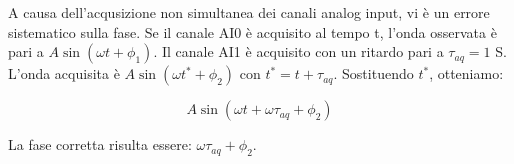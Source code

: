 \documentclass[../Relazione_circuiti]{subfiles}
\begin{document}
A causa dell'acqusizione non simultanea dei canali analog input, vi è un errore sistematico sulla fase.
Se il canale AI0 è acquisito al tempo t, l'onda osservata è pari a $A\sin(\omega t +\phi_1)$. Il canale AI1 è acquisito con un ritardo pari a $\tau_{aq} = 1$ \textmu S. L'onda acquisita è $A\sin(\omega t^* +\phi_2)$ con $t^*=t+\tau_{aq}$. Sostituendo $t^*$, otteniamo:

\begin{equation}
A\sin(\omega t + \omega \tau_{aq} + \phi_2)
\end{equation}

La fase corretta risulta essere: $\omega \tau_{aq} + \phi_2$.
\end{document}

